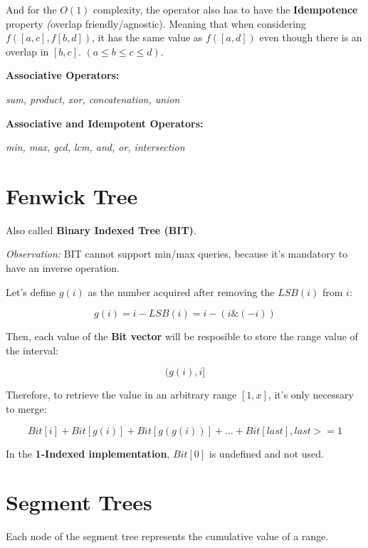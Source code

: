     And for the $O(1)$ complexity, the operator also has to have the \textbf{Idempotence} property
    \textit(overlap friendly/agnostic). Meaning that when considering $f([a, c], f[b, d])$, it has the same value 
    as $f([a, d])$ even though there is an overlap in $[b, c]$. $(a \leq b \leq c \leq d)$.

    \textbf{Associative Operators:}

    \textit{sum, product, xor, concatenation, union}

    \textbf{Associative and Idempotent Operators:}

    \textit{min, max, gcd, lcm, and, or, intersection}



\section{Fenwick Tree}

    Also called \textbf{Binary Indexed Tree (BIT)}.

    \textit{Observation:} BIT cannot support min/max queries, because it's mandatory to have an inverse operation.

    Let's define $g(i)$ as the number acquired after removing the $LSB(i)$ from $i$:

        $$ g(i) = i - LSB(i) = i - (i \& (-i)) $$

    Then, each value of the \textbf{Bit vector} will be resposible to store the range value of the interval:

        $$ (g(i), i] $$

    Therefore, to retrieve the value in an arbitrary range $[1, x]$, it's only necessary to merge:

        $$ Bit[i] + Bit[g(i)] + Bit[g(g(i))] + ... + Bit[last], last >= 1$$

    In the \textbf{1-Indexed implementation}, $Bit[0]$ is undefined and not used.

    

\section{Segment Trees}

    Each node of the segment tree represents the cumulative value of a range.

